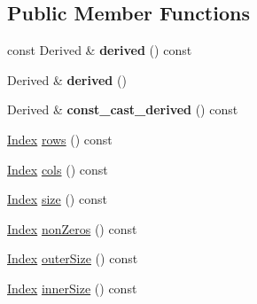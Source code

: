 \subsection*{Public Member Functions}
\begin{DoxyCompactItemize}
\item 
\mbox{\label{class_eigen_1_1_skyline_matrix_base_a854b1648519580b953e608018f467bcf}} 
const Derived \& {\bfseries derived} () const
\item 
\mbox{\label{class_eigen_1_1_skyline_matrix_base_a557f6ad3ed3e9deddff8721c1ab05ce2}} 
Derived \& {\bfseries derived} ()
\item 
\mbox{\label{class_eigen_1_1_skyline_matrix_base_a435a0804e6832db6b5df601a51707ace}} 
Derived \& {\bfseries const\+\_\+cast\+\_\+derived} () const
\item 
\hyperlink{group___core___module_a554f30542cc2316add4b1ea0a492ff02}{Index} \hyperlink{class_eigen_1_1_skyline_matrix_base_a8243b2fe6bcc6c3037717fcb0afa9d46}{rows} () const
\item 
\hyperlink{group___core___module_a554f30542cc2316add4b1ea0a492ff02}{Index} \hyperlink{class_eigen_1_1_skyline_matrix_base_aff9cfadb45ffbae8a33b710bc9b49d71}{cols} () const
\item 
\hyperlink{group___core___module_a554f30542cc2316add4b1ea0a492ff02}{Index} \hyperlink{class_eigen_1_1_skyline_matrix_base_a635234baea6bd59f97e6bd219adbdb64}{size} () const
\item 
\hyperlink{group___core___module_a554f30542cc2316add4b1ea0a492ff02}{Index} \hyperlink{class_eigen_1_1_skyline_matrix_base_aaeda265186dd626052df8580779b7460}{non\+Zeros} () const
\item 
\hyperlink{group___core___module_a554f30542cc2316add4b1ea0a492ff02}{Index} \hyperlink{class_eigen_1_1_skyline_matrix_base_a63cc4a263d32a8a225e4a42e891b8ac0}{outer\+Size} () const
\item 
\hyperlink{group___core___module_a554f30542cc2316add4b1ea0a492ff02}{Index} \hyperlink{class_eigen_1_1_skyline_matrix_base_a901f2691facc1a0321740300dc7a12d7}{inner\+Size} () const
\item 
\mbox{\label{class_eigen_1_1_skyline_matrix_base_ae6d374973777f0a193e36e77a3279f7c}} 

\end{DoxyCompactItemize}
